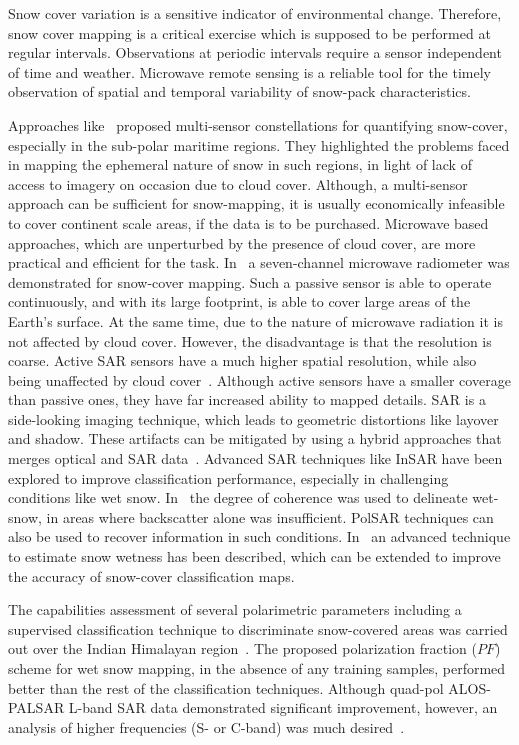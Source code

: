 Snow cover variation is a sensitive indicator of environmental change. Therefore, snow cover mapping is a critical exercise which is supposed to be performed at regular intervals. Observations at periodic intervals require a sensor independent of time and weather. Microwave remote sensing is a reliable tool for the timely observation of spatial and temporal variability of snow-pack characteristics. 

Approaches like~\cite{slater1999potential} proposed multi-sensor constellations for quantifying snow-cover, especially in the sub-polar maritime regions. They highlighted the problems faced in mapping the ephemeral nature of snow in such regions, in light of lack of access to imagery on occasion due to cloud cover. Although, a multi-sensor approach can be sufficient for snow-mapping, it is usually economically infeasible to cover continent scale areas, if the data is to be purchased. Microwave based approaches, which are unperturbed by the presence of cloud cover, are more practical and efficient for the task. In~\cite{grody1991classification} a seven-channel microwave radiometer was demonstrated for snow-cover mapping. Such a passive sensor is able to operate continuously, and with its large footprint, is able to cover large areas of the Earth's surface. At the same time, due to the nature of microwave radiation it is not affected by cloud cover. However, the disadvantage is that the resolution is coarse. Active SAR sensors have a much higher spatial resolution, while also being unaffected by cloud cover~\cite{shi1994snow}. Although active sensors have a smaller coverage than passive ones, they have far increased ability to mapped details. SAR is a side-looking imaging technique, which leads to geometric distortions like layover and shadow. These artifacts can be mitigated by using a hybrid approaches that merges optical and SAR data~\cite{koskinen1999snow}.
%
Advanced SAR techniques like InSAR have been explored to improve classification performance, especially in challenging conditions like wet snow. In~\cite{strozzi1999mapping} the degree of coherence was used to delineate wet-snow, in areas where backscatter alone was insufficient. PolSAR techniques can also be used to recover information in such conditions. In~\cite{surendar2013improved} an advanced technique to estimate snow wetness has been described, which can be extended to improve the accuracy of snow-cover classification maps.

The capabilities assessment of several polarimetric parameters including a supervised classification technique to discriminate snow-covered areas was carried out over the Indian Himalayan region~\cite{singh2014capability}. The proposed polarization fraction ($PF$) scheme for wet snow mapping, in the absence of any training samples, performed better than the rest of the classification techniques. Although quad-pol ALOS-PALSAR L-band SAR data demonstrated significant improvement, however, an analysis of higher frequencies (S- or C-band) was much desired~\cite{rott1987possibilities}. 


